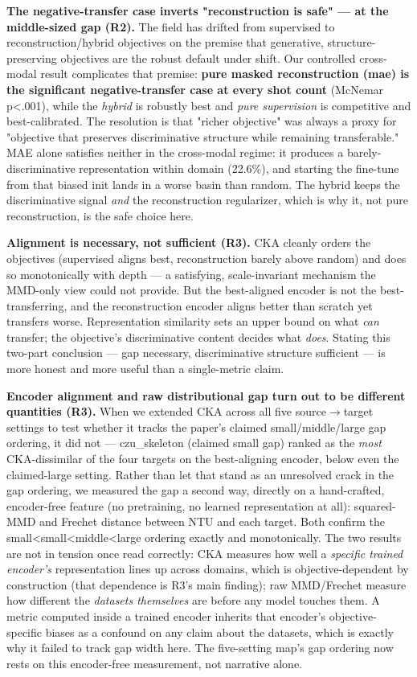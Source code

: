 \textbf{The negative-transfer case inverts "reconstruction is safe" --- at the middle-sized gap (R2).} The field has drifted from supervised to reconstruction/hybrid objectives on the premise that generative, structure-preserving objectives are the robust default under shift. Our controlled cross-modal result complicates that premise: \textbf{pure masked reconstruction (mae) is the significant negative-transfer case at every shot count} (McNemar p<.001), while the \textit{hybrid} is robustly best and \textit{pure supervision} is competitive and best-calibrated. The resolution is that "richer objective" was always a proxy for "objective that preserves discriminative structure while remaining transferable." MAE alone satisfies neither in the cross-modal regime: it produces a barely-discriminative representation within domain (22.6\%), and starting the fine-tune from that biased init lands in a worse basin than random. The hybrid keeps the discriminative signal \textit{and} the reconstruction regularizer, which is why it, not pure reconstruction, is the safe choice here.

\textbf{Alignment is necessary, not sufficient (R3).} CKA cleanly orders the objectives (supervised aligns best, reconstruction barely above random) and does so monotonically with depth --- a satisfying, scale-invariant mechanism the MMD-only view could not provide. But the best-aligned encoder is not the best-transferring, and the reconstruction encoder aligns better than scratch yet transfers worse. Representation similarity sets an upper bound on what \textit{can} transfer; the objective's discriminative content decides what \textit{does}. Stating this two-part conclusion --- gap necessary, discriminative structure sufficient --- is more honest and more useful than a single-metric claim.

\textbf{Encoder alignment and raw distributional gap turn out to be different quantities (R3).} When we extended CKA across all five source$\rightarrow$target settings to test whether it tracks the paper's claimed small/middle/large gap ordering, it did not --- czu\_skeleton (claimed small gap) ranked as the \textit{most} CKA-dissimilar of the four targets on the best-aligning encoder, below even the claimed-large setting. Rather than let that stand as an unresolved crack in the gap ordering, we measured the gap a second way, directly on a hand-crafted, encoder-free feature (no pretraining, no learned representation at all): squared-MMD and Frechet distance between NTU and each target. Both confirm the small<small<middle<large ordering exactly and monotonically. The two results are not in tension once read correctly: CKA measures how well a \textit{specific trained encoder's} representation lines up across domains, which is objective-dependent by construction (that dependence is R3's main finding); raw MMD/Frechet measure how different the \textit{datasets themselves} are before any model touches them. A metric computed inside a trained encoder inherits that encoder's objective-specific biases as a confound on any claim about the datasets, which is exactly why it failed to track gap width here. The five-setting map's gap ordering now rests on this encoder-free measurement, not narrative alone.

